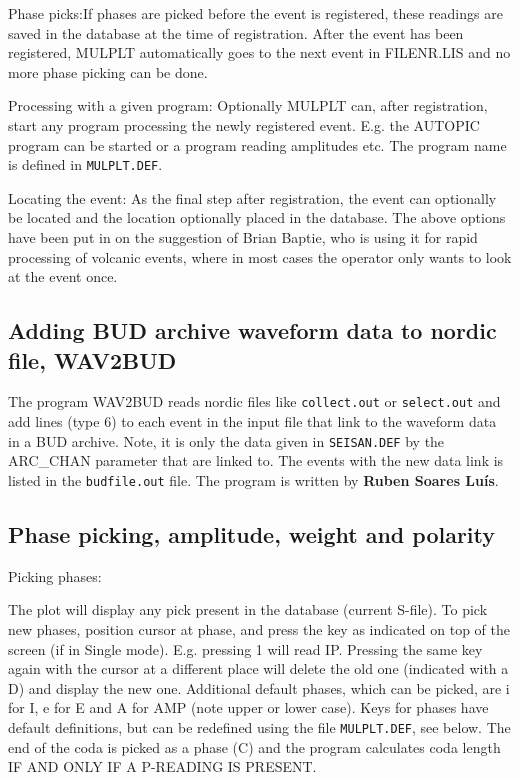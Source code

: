 Phase picks:If phases are picked before the event is registered, these readings are saved in the database at the time of registration. After the event has been registered, MULPLT automatically goes to the next event in FILENR.LIS and no more phase picking can be done. 

Processing with a given program: 
Optionally MULPLT can, after registration, start any program processing the newly registered event. 
E.g. the AUTOPIC program can be started or a program reading amplitudes etc. The program name is defined in \texttt{MULPLT.DEF}. 

Locating the event: As the final step after registration, the event 
can optionally be located and the location optionally placed in the 
database. \newline
The above options have been put in on the suggestion of Brian Baptie, who is using it for rapid processing of volcanic events, where in most cases the operator only wants to look at the event once. 

\subsection{Adding BUD archive waveform data to nordic file, WAV2BUD}
\label{page:wav2bud}


The program WAV2BUD reads nordic files like \texttt{collect.out} or 
\texttt{select.out} and add lines (type 6) to each event in the input file 
that link to the waveform data in a BUD archive.
Note, it is only the data given in \texttt{SEISAN.DEF} by the 
ARC\_CHAN parameter that are linked to. The events with the 
new data link is listed in the \texttt{budfile.out} file.\newline
The program is written by \textbf{Ruben Soares Lu\'is}.

\subsection{Phase picking, amplitude, weight and polarity}

Picking phases: 

The plot will display any pick present in the database (current S-file). To pick new phases, position cursor at phase, and press the key as indicated on top of the screen (if in Single mode). E.g. pressing 1 will read IP. Pressing the same key again with the cursor at a different place will delete the old one (indicated with a D) and display the new one. Additional default phases, which can be picked, are i for I, e for E and A for AMP (note upper or lower case). Keys for phases have default definitions, but can be redefined using the file \texttt{MULPLT.DEF}, see below. The end of the coda is picked as a phase (C) and the program calculates coda length IF AND ONLY IF A P-READING IS PRESENT. 

